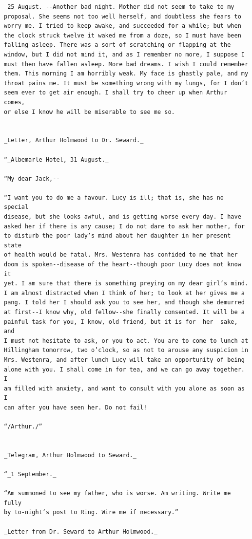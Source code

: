 \documentclass{article}
\begin{document}
\begin{verbatim}
_25 August._--Another bad night. Mother did not seem to take to my
proposal. She seems not too well herself, and doubtless she fears to
worry me. I tried to keep awake, and succeeded for a while; but when
the clock struck twelve it waked me from a doze, so I must have been
falling asleep. There was a sort of scratching or flapping at the
window, but I did not mind it, and as I remember no more, I suppose I
must then have fallen asleep. More bad dreams. I wish I could remember
them. This morning I am horribly weak. My face is ghastly pale, and my
throat pains me. It must be something wrong with my lungs, for I don’t
seem ever to get air enough. I shall try to cheer up when Arthur comes,
or else I know he will be miserable to see me so.


_Letter, Arthur Holmwood to Dr. Seward._

“_Albemarle Hotel, 31 August._

“My dear Jack,--

“I want you to do me a favour. Lucy is ill; that is, she has no special
disease, but she looks awful, and is getting worse every day. I have
asked her if there is any cause; I do not dare to ask her mother, for
to disturb the poor lady’s mind about her daughter in her present state
of health would be fatal. Mrs. Westenra has confided to me that her
doom is spoken--disease of the heart--though poor Lucy does not know it
yet. I am sure that there is something preying on my dear girl’s mind.
I am almost distracted when I think of her; to look at her gives me a
pang. I told her I should ask you to see her, and though she demurred
at first--I know why, old fellow--she finally consented. It will be a
painful task for you, I know, old friend, but it is for _her_ sake, and
I must not hesitate to ask, or you to act. You are to come to lunch at
Hillingham tomorrow, two o’clock, so as not to arouse any suspicion in
Mrs. Westenra, and after lunch Lucy will take an opportunity of being
alone with you. I shall come in for tea, and we can go away together. I
am filled with anxiety, and want to consult with you alone as soon as I
can after you have seen her. Do not fail!

“/Arthur./”


_Telegram, Arthur Holmwood to Seward._

“_1 September._

“Am summoned to see my father, who is worse. Am writing. Write me fully
by to-night’s post to Ring. Wire me if necessary.”

_Letter from Dr. Seward to Arthur Holmwood._


\end{verbatim}
\end{document}
